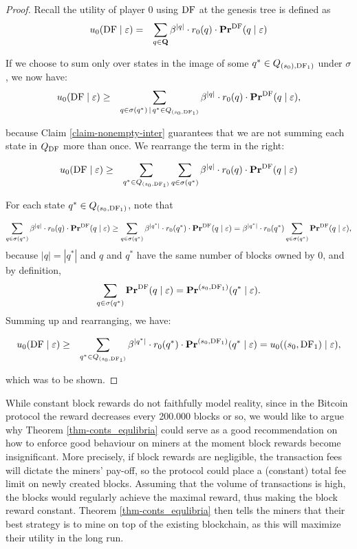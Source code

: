 \begin{proof}
Recall the utility of player $0$ using $\text{\rm DF}$ at the genesis tree is defined as 
\begin{eqnarray*}
u_0(\text{\rm DF} \mid \varepsilon) & = & \sum_{q \in \mathbf{Q}} \beta^{|q|} \cdot  r_0(q) \cdot \mathbf{Pr}^{\text{\rm DF}}(q \mid \varepsilon)
\end{eqnarray*}

If we choose to sum only over states in the image of some $q^* \in Q_{(s_0),\text{\rm DF}_1)}$ under $\sigma$, we now have: 
\begin{eqnarray*}
u_0(\text{\rm DF} \mid \varepsilon) & \geq & \sum_{q \in \sigma(q^*) \,\mid\, q^* \in Q_{(s_0,\text{\rm DF}_1)}} \beta^{|q|} \cdot  r_0(q) \cdot \mathbf{Pr}^{\text{\rm DF}}(q \mid \varepsilon),
\end{eqnarray*}

because Claim \ref{claim-nonempty-inter} guarantees that we are not summing each state in $Q_{\text{\rm DF}}$ more than once. We rearrange the term in the right: 

\begin{eqnarray*}
u_0(\text{\rm DF} \mid \varepsilon) & \geq &\sum_{q^* \in Q_{(s_0,\text{\rm DF}_1)}}   \sum_{q \in \sigma(q^*)} \beta^{|q|} \cdot  r_0(q) \cdot \mathbf{Pr}^{\text{\rm DF}}(q \mid \varepsilon)
\end{eqnarray*}

For each state $q^* \in Q_{(s_0,\text{\rm DF}_1)}$, note that 

$$\sum_{q \in \sigma(q^*)} \beta^{|q|} \cdot  r_0(q) \cdot \mathbf{Pr}^{\text{\rm DF}}(q \mid \varepsilon) \geq \sum_{q \in \sigma(q^*)} \beta^{|q^*|} \cdot  r_0(q^*) \cdot \mathbf{Pr}^{\text{\rm DF}}(q \mid \varepsilon) = \beta^{|q^*|} \cdot  r_0(q^*) \sum_{q \in \sigma(q^*)}  \mathbf{Pr}^{\text{\rm DF}}(q \mid \varepsilon), $$ because $|q| = |q^*|$ and 
$q$ and $q^*$ have the same number of blocks owned by $0$, and by definition,
$$\sum_{q \in \sigma(q^*)}  \mathbf{Pr}^{\text{\rm DF}}(q \mid \varepsilon) = \mathbf{Pr}^{(s_0,\text{\rm DF}_1)}(q^* \mid \varepsilon).$$ 
Summing up and rearranging, we have: 

\begin{eqnarray*}
u_0(\text{\rm DF} \mid \varepsilon) & \geq &\sum_{q^* \in Q_{(s_0,\text{\rm DF}_1)}}  \beta^{|q^*|} \cdot  r_0(q^*) \cdot \mathbf{Pr}^{(s_0,\text{\rm DF}_1)}(q^* \mid \varepsilon) = u_0((s_0,\text{\rm DF}_1) \mid \varepsilon), 
\end{eqnarray*}

which was to be shown.
\end{proof}


While constant block rewards do not faithfully model reality, since in the Bitcoin protocol the reward decreases every 200.000 blocks or so, we would like to argue why Theorem \ref{thm-conts_equlibria} could serve as a good recommendation on how to enforce good behaviour on miners at the moment block rewards become insignificant. More precisely, if block rewards are negligible, the transaction fees will dictate the miners' pay-off, so the protocol could place a (constant) total fee limit on newly created blocks. Assuming that the volume of transactions is high, the blocks would regularly achieve the maximal reward, thus making the block reward constant. Theorem \ref{thm-conts_equlibria} then tells the miners that their best strategy is to mine on top of the existing blockchain, as this will maximize their utility in the long run.



